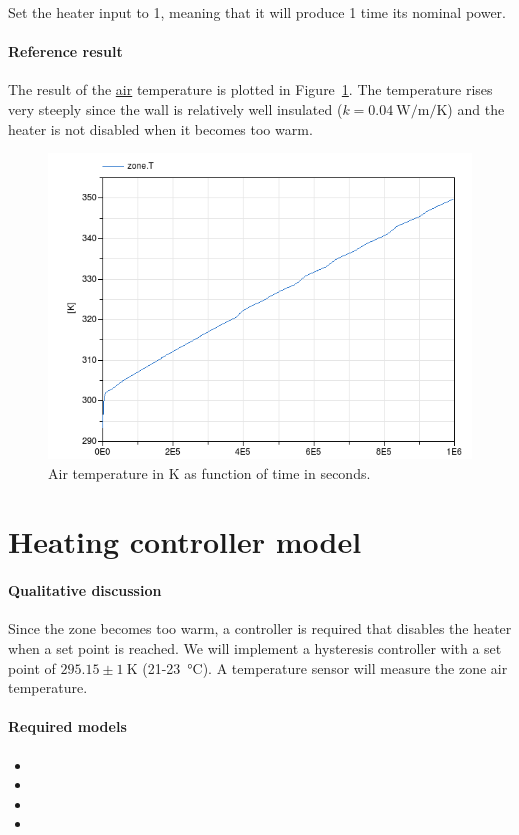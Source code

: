 \documentclass[10pt,a4paper]{article}
\begin{document}
Set the heater input to 1, meaning that it will
produce 1 time its nominal power.


\paragraph{Reference result}
The result of the \underline{air} temperature 
is plotted in Figure~\ref{fig:res4}.
The temperature rises very steeply since the 
wall is relatively well insulated ($k=\SI{0.04}{\watt\per\meter\per\kelvin}$)
and the heater is not disabled when it becomes too warm.



\begin{figure}
\centering
\includegraphics[scale=0.6]{result4.png}
\caption{Air temperature in K as function of time in seconds.}
\label{fig:res4}
\end{figure}


\section{Heating controller model}
\paragraph{Qualitative discussion}
Since the zone becomes too warm, a controller
is required that disables the
heater when a set point is reached.
We will implement a hysteresis controller with a set point of $295.15 \pm \SI{1}{\kelvin}$ 
(21-\SI{23}{\celsius}).
A temperature sensor will measure the zone air temperature.


\paragraph{Required models}
\begin{itemize}
\item {}
\item {}
\item {}
\item {}
\end{itemize}
\end{document}

